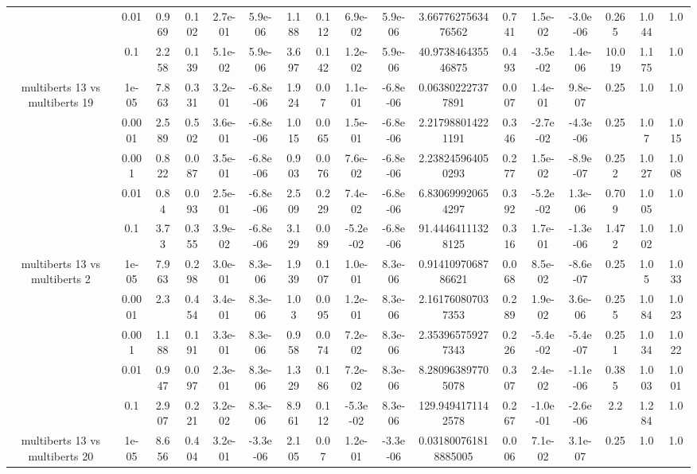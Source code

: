 \begin{tabular}{|c|c|c|c|c|c|c|c|c|c|c|c|c|c|c|c|c|}
 & 0.01 & 0.969 & 0.102 & 2.7e-01 & 5.9e-06 & 1.188 & 0.112 & 6.9e-02 & 5.9e-06 & 3.6677627563476562 & 0.741 & 1.5e-02 & -3.0e-06 & 0.265 & 1.044 & 1.0 \\
 & 0.1 & 2.258 & 0.139 & 5.1e-02 & 5.9e-06 & 3.697 & 0.142 & 1.2e-02 & 5.9e-06 & 40.973846435546875 & 0.493 & -3.5e-02 & 1.4e-06 & 10.019 & 1.175 & 1.0 \\
\hline
\multirow{5}{*}{multiberts 13 vs multiberts 19} & 1e-05 & 7.863 & 0.331 & 3.2e-01 & -6.8e-06 & 1.924 & 0.07 & 1.1e-01 & -6.8e-06 & 0.063802227377891 & 0.007 & 1.4e-01 & 9.8e-07 & 0.25 & 1.0 & 1.0 \\
 & 0.0001 & 2.589 & 0.502 & 3.6e-01 & -6.8e-06 & 1.015 & 0.065 & 1.5e-01 & -6.8e-06 & 2.217988014221191 & 0.346 & -2.7e-02 & -4.3e-06 & 0.25 & 1.07 & 1.015 \\
 & 0.001 & 0.822 & 0.087 & 3.5e-01 & -6.8e-06 & 0.903 & 0.076 & 7.6e-02 & -6.8e-06 & 2.238245964050293 & 0.277 & 1.5e-02 & -8.9e-07 & 0.252 & 1.027 & 1.008 \\
 & 0.01 & 0.84 & 0.093 & 2.5e-01 & -6.8e-06 & 2.509 & 0.229 & 7.4e-02 & -6.8e-06 & 6.830699920654297 & 0.392 & -5.2e-02 & 1.3e-06 & 0.709 & 1.005 & 1.0 \\
 & 0.1 & 3.73 & 0.355 & 3.9e-02 & -6.8e-06 & 3.129 & 0.089 & -5.2e-02 & -6.8e-06 & 91.44464111328125 & 0.316 & 1.7e-01 & -1.3e-06 & 1.472 & 1.002 & 1.0 \\
\hline
\multirow{5}{*}{multiberts 13 vs multiberts 2} & 1e-05 & 7.963 & 0.298 & 3.0e-01 & 8.3e-06 & 1.939 & 0.107 & 1.0e-01 & 8.3e-06 & 0.9141097068786621 & 0.068 & 8.5e-02 & -8.6e-07 & 0.25 & 1.05 & 1.033 \\
 & 0.0001 & 2.3 & 0.454 & 3.4e-01 & 8.3e-06 & 1.03 & 0.095 & 1.2e-01 & 8.3e-06 & 2.161760807037353 & 0.289 & 1.9e-02 & 3.6e-06 & 0.255 & 1.084 & 1.023 \\
 & 0.001 & 1.188 & 0.191 & 3.3e-01 & 8.3e-06 & 0.958 & 0.074 & 7.2e-02 & 8.3e-06 & 2.353965759277343 & 0.226 & -5.4e-02 & -5.4e-07 & 0.251 & 1.034 & 1.022 \\
 & 0.01 & 0.947 & 0.097 & 2.3e-01 & 8.3e-06 & 1.329 & 0.186 & 7.2e-02 & 8.3e-06 & 8.280963897705078 & 0.307 & 2.4e-02 & -1.1e-06 & 0.385 & 1.003 & 1.001 \\
 & 0.1 & 2.907 & 0.221 & 3.2e-02 & 8.3e-06 & 8.961 & 0.112 & -5.3e-02 & 8.3e-06 & 129.9494171142578 & 0.267 & -1.0e-01 & -2.6e-06 & 2.2 & 1.284 & 1.0 \\
\hline
\multirow{5}{*}{multiberts 13 vs multiberts 20} & 1e-05 & 8.656 & 0.404 & 3.2e-01 & -3.3e-06 & 2.105 & 0.07 & 1.2e-01 & -3.3e-06 & 0.031800761818885005 & 0.006 & 7.1e-02 & 3.1e-07 & 0.25 & 1.0 & 1.0 \\

\end{tabular}
